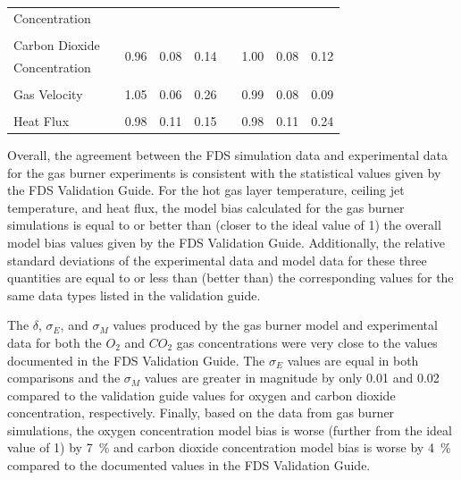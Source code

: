 \begin{table}[!ht]
\begin{center}
\begin{tabular}{lcccccccc}
Concentration 		& & 					   & 					  & 					   & & 						& 					   &						\\
\multicolumn{9}{c}{} \\
Carbon Dioxide 		& & \multirow{2}{*}{0.96}  & \multirow{2}{*}{0.08} & \multirow{2}{*}{0.14} & & \multirow{2}{*}{1.00} & \multirow{2}{*}{0.08} & \multirow{2}{*}{0.12} 	\\
Concentration 		& & 					   & 					  & 					   & & 						& 					   &						\\
\multicolumn{9}{c}{} \\
Gas Velocity 		& & 1.05  & 0.06 & 0.26 & & 0.99 & 0.08 & 0.09 	\\
\multicolumn{9}{c}{} \\
Heat Flux 			& & 0.98  & 0.11 & 0.15 & & 0.98 & 0.11 & 0.24 	\\
\bottomrule
\end{tabular}
\end{center}
\label{table:stats_compare}
\end{table}

Overall, the agreement between the FDS simulation data and experimental data for the gas burner experiments is consistent with the statistical values given by the FDS Validation Guide. For the hot gas layer temperature, ceiling jet temperature, and heat flux, the model bias calculated for the gas burner simulations is equal to or better than (closer to the ideal value of 1) the overall model bias values given by the FDS Validation Guide. Additionally, the relative standard deviations of the experimental data and model data for these three quantities are equal to or less than (better than) the corresponding values for the same data types listed in the validation guide. 

The $\delta$, $\sigma_E$, and $\sigma_M$ values produced by the gas burner model and experimental data for both the $O_2$ and $CO_2$ gas concentrations were very close to the values documented in the FDS Validation Guide. The $\sigma_E$ values are equal in both comparisons and the $\sigma_M$ values are greater in magnitude by only 0.01 and 0.02 compared to the validation guide values for oxygen and carbon dioxide concentration, respectively. Finally, based on the data from gas burner simulations, the oxygen concentration model bias is worse (further from the ideal value of 1) by 7~\% and carbon dioxide concentration model bias is worse by 4~\% compared to the documented values in the FDS Validation Guide.

